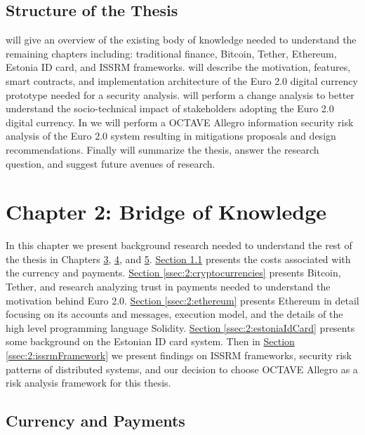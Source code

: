 \documentclass[a4paper,12pt]{article} %
\newcommand{\hypernameref}[1]{\hyperref[#1]{\nameref{#1}}}
\newcommand{\hypersectionref}[1]{\hyperref[#1]{Section \ref{#1}}}
\begin{document}
\subsection{Structure of the Thesis} \label{ssec:1.4}

\hypernameref{sec:2} will give an overview of the existing body of knowledge needed to understand the remaining chapters including: traditional finance, Bitcoin, Tether, Ethereum, Estonia ID card, and ISSRM frameworks. \hypernameref{sec:3} will describe the motivation, features, smart contracts, and implementation architecture of the Euro 2.0 digital currency prototype needed for a security analysis. \hypernameref{sec:4} will perform a change analysis to better understand the socio-technical impact of stakeholders adopting the Euro 2.0 digital currency. In \hypernameref{sec:5} we will perform a OCTAVE Allegro information security risk analysis of the Euro 2.0 system resulting in mitigations proposals and design recommendations. Finally \hypernameref{sec:6} will summarize the thesis, answer the research question, and suggest future avenues of research.

\pagebreak

\section{Chapter 2: Bridge of Knowledge} \label{sec:2}

In this chapter we present background research needed to understand the rest of the thesis in Chapters \hyperref[sec:3]{3}, \hyperref[sec:4]{4}, and \hyperref[sec:5]{5}. \hypersectionref{ssec:2:finance} presents the costs associated with the currency and payments. \hypersectionref{ssec:2:cryptocurrencies} presents Bitcoin, Tether, and research analyzing trust in payments needed to understand the motivation behind Euro 2.0. \hypersectionref{ssec:2:ethereum} presents Ethereum in detail focusing on its accounts and messages, execution model, and the details of the high level programming language Solidity. \hypersectionref{ssec:2:estoniaIdCard} presents some background on the Estonian ID card system. Then in \hypersectionref{ssec:2:issrmFramework} we present findings on ISSRM frameworks, security risk patterns of distributed systems, and our decision to choose OCTAVE Allegro as a risk analysis framework for this thesis.

\subsection{Currency and Payments} \label{ssec:2:finance}
\end{document}

